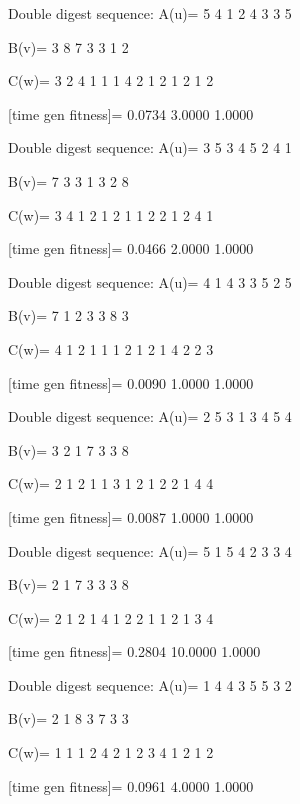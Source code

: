 Double digest sequence:
A(u)=
     5     4     1     2     4     3     3     5

B(v)=
     3     8     7     3     3     1     2

C(w)=
     3     2     4     1     1     1     4     2     1     2     1     2     1     2

[time gen fitness]=
    0.0734    3.0000    1.0000

Double digest sequence:
A(u)=
     3     5     3     4     5     2     4     1

B(v)=
     7     3     3     1     3     2     8

C(w)=
     3     4     1     2     1     2     1     1     2     2     1     2     4     1

[time gen fitness]=
    0.0466    2.0000    1.0000

Double digest sequence:
A(u)=
     4     1     4     3     3     5     2     5

B(v)=
     7     1     2     3     3     8     3

C(w)=
     4     1     2     1     1     1     2     1     2     1     4     2     2     3

[time gen fitness]=
    0.0090    1.0000    1.0000

Double digest sequence:
A(u)=
     2     5     3     1     3     4     5     4

B(v)=
     3     2     1     7     3     3     8

C(w)=
     2     1     2     1     1     3     1     2     1     2     2     1     4     4

[time gen fitness]=
    0.0087    1.0000    1.0000

Double digest sequence:
A(u)=
     5     1     5     4     2     3     3     4

B(v)=
     2     1     7     3     3     3     8

C(w)=
     2     1     2     1     4     1     2     2     1     1     2     1     3     4

[time gen fitness]=
    0.2804   10.0000    1.0000

Double digest sequence:
A(u)=
     1     4     4     3     5     5     3     2

B(v)=
     2     1     8     3     7     3     3

C(w)=
     1     1     1     2     4     2     1     2     3     4     1     2     1     2

[time gen fitness]=
    0.0961    4.0000    1.0000

